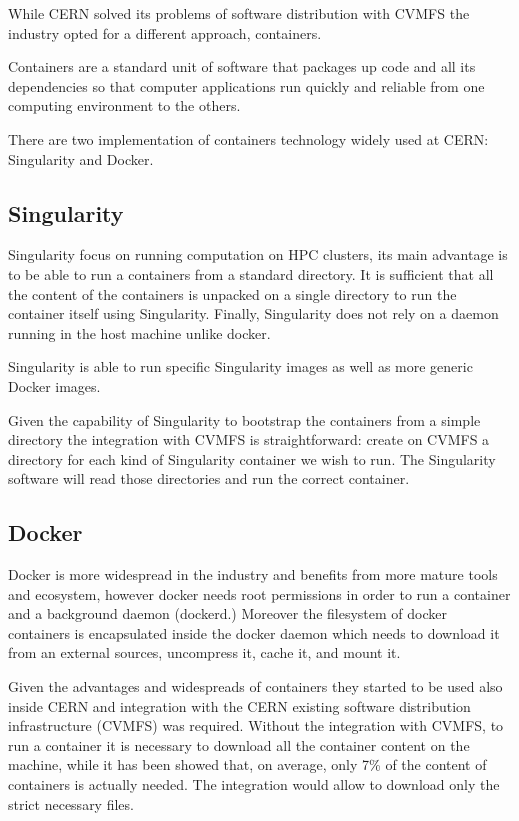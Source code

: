 While CERN solved its problems of software distribution with CVMFS the industry opted for a different approach, containers.

Containers are a standard unit of software that packages up code and all its dependencies so that computer applications run quickly and reliable from one computing environment to the others.

There are two implementation of containers technology widely used at CERN: Singularity and Docker.

\subsection{Singularity}

Singularity focus on running computation on HPC clusters, its main advantage is to be able to run a containers from a standard directory. It is sufficient that all the content of the containers is unpacked on a single directory to run the container itself using Singularity. Finally, Singularity does not rely on a daemon running in the host machine unlike docker.

Singularity is able to run specific Singularity images as well as more generic Docker images.

Given the capability of Singularity to bootstrap the containers from a simple directory the integration with CVMFS is straightforward: create on CVMFS a directory for each kind of Singularity container we wish to run. The Singularity software will read those directories and run the correct container.

\subsection{Docker}
\label{subsec:docker-thin-images}

Docker is more widespread in the industry and benefits from more mature tools and ecosystem, however docker needs root permissions in order to run a container and a background daemon (dockerd.) Moreover the filesystem of docker containers is encapsulated inside the docker daemon which needs to download it from an external sources, uncompress it, cache it, and mount it. 

Given the advantages and widespreads of containers they started to be used also inside CERN and integration with the CERN existing software distribution infrastructure (CVMFS) was required. 
Without the integration with CVMFS, to run a container it is necessary to download all the container content on the machine, while it has been showed that, on average, only 7\% of the content of containers is actually needed. 
The integration would allow to download only the strict necessary files.

